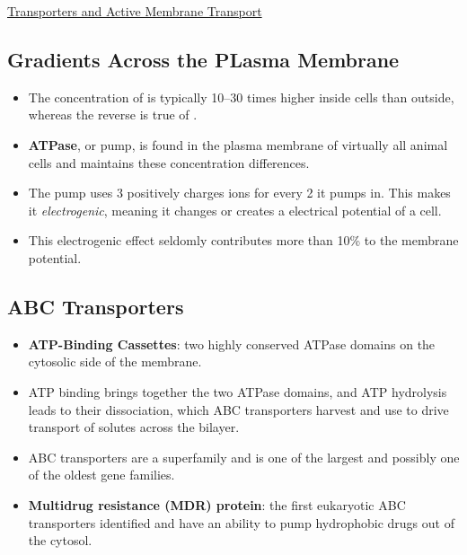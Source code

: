 \documentclass[12pt,letterpaper]{article}
\begin{document}
\begin{secbox}{\hyperlink{11}{Transporters and Active Membrane Transport}}
{    \hypertarget{11.2.5}{\subsection*{Gradients Across the PLasma Membrane}}
    \begin{itemize}
        \item The concentration of  is typically 10–30 times higher inside cells than outside, whereas the reverse is true of .
        \item \textbf{ ATPase}, or  pump, is found in the plasma membrane of virtually all animal cells and maintains these concentration differences.
        \item  The  pump uses 3 positively charges ions for every 2 it pumps in. This makes it \textit{electrogenic}, meaning it changes or creates a electrical potential of a cell. 
        \item This electrogenic effect seldomly contributes more than 10\% to the membrane potential.
    \end{itemize}
    
    \hypertarget{11.2.6}{\subsection*{ABC Transporters}}
    \begin{itemize}
        \item \textbf{ATP-Binding Cassettes}: two highly conserved ATPase domains on the cytosolic side of the membrane.
        \item ATP binding brings together the two ATPase domains, and ATP hydrolysis leads to their dissociation, which ABC transporters harvest and use to drive transport of solutes across the bilayer.
        \item ABC transporters are a superfamily and is one of the largest and possibly one of the oldest gene families.
        \item \textbf{Multidrug resistance (MDR) protein}: the first eukaryotic ABC transporters identified and have an ability to pump hydrophobic drugs out of the cytosol.
    \end{itemize}
    
}
\end{secbox}
\end{document}
